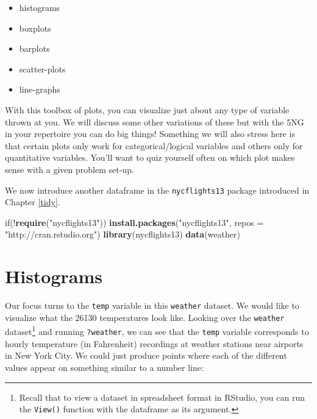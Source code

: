 \documentclass[]{tufte-book}
\newenvironment{Shaded}{\begin{snugshade}}{\end{snugshade}}
\newcommand{\KeywordTok}[1]{\textcolor[rgb]{0.13,0.29,0.53}{\textbf{{#1}}}}
\newcommand{\DataTypeTok}[1]{\textcolor[rgb]{0.13,0.29,0.53}{{#1}}}
\newcommand{\StringTok}[1]{\textcolor[rgb]{0.31,0.60,0.02}{{#1}}}
\newcommand{\NormalTok}[1]{{#1}}
\providecommand{\tightlist}{%
  \setlength{\itemsep}{0pt}\setlength{\parskip}{0pt}}
\begin{document}
\begin{itemize}
\tightlist
\item
  histograms
\item
  boxplots
\item
  barplots
\item
  scatter-plots
\item
  line-graphs
\end{itemize}

With this toolbox of plots, you can visualize just about any type of
variable thrown at you. We will discuss some other variations of these
but with the 5NG in your repertoire you can do big things! Something we
will also stress here is that certain plots only work for
categorical/logical variables and others only for quantitative
variables. You'll want to quiz yourself often on which plot makes sense
with a given problem set-up.

We now introduce another dataframe in the \texttt{nycflights13} package
introduced in Chapter \ref{tidy}.

\begin{Shaded}
\begin{Highlighting}[]
\NormalTok{if(!}\KeywordTok{require}\NormalTok{(}\StringTok{"nycflights13"}\NormalTok{))}
  \KeywordTok{install.packages}\NormalTok{(}\StringTok{"nycflights13"}\NormalTok{, }\DataTypeTok{repos =} \StringTok{"http://cran.rstudio.org"}\NormalTok{)}
\KeywordTok{library}\NormalTok{(nycflights13)}
\KeywordTok{data}\NormalTok{(weather)}
\end{Highlighting}
\end{Shaded}

\section{Histograms}\label{histograms}

Our focus turns to the \texttt{temp} variable in this \texttt{weather}
dataset. We would like to visualize what the 26130 temperatures look
like. Looking over the \texttt{weather} dataset\footnote{Recall that to
  view a dataset in spreadsheet format in RStudio, you can run the
  \texttt{View()} function with the dataframe as its argument.} and
running \texttt{?weather}, we can see that the \texttt{temp} variable
corresponds to hourly temperature (in Fahrenheit) recordings at weather
stations near airports in New York City. We could just produce points
where each of the different values appear on something similar to a
number line:
\end{document}
